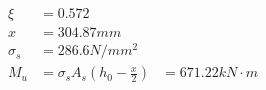 \documentclass{article}
\begin{document}
\begin{questionList}
\begin{enumerate}
\begin{align*}
                        \xi                          & =0.572                                           \\
                        x                            & =304.87mm                                        \\
                        \sigma_s                     & =286.6N/mm^2                                     \\
                        M_u                          & =\sigma_sA_s(h_0-\frac{x}{2}) & =671.22kN\cdot m
                  \end{align*}
      \end{enumerate}
      \setcounter{enumi}{9}
      \item 
\end{questionList}
\end{document}
